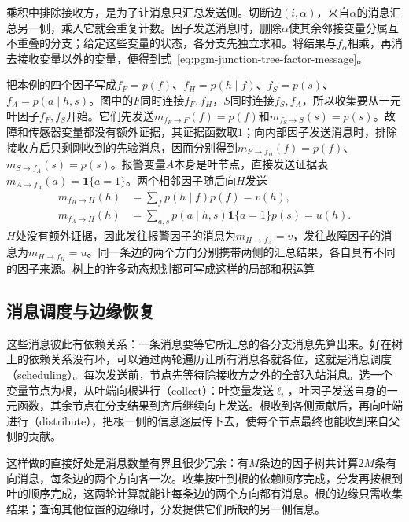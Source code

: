 乘积中排除接收方，是为了让消息只汇总发送侧。切断边$(i,\alpha)$，来自$\alpha$的消息汇总另一侧，乘入它就会重复计数。因子发送消息时，删除$\alpha$使其余邻接变量分属互不重叠的分支；给定这些变量的状态，各分支先独立求和。将结果与$f_\alpha$相乘，再消去接收变量以外的变量，便得到式~\eqref{eq:pgm-junction-tree-factor-message}。

把本例的四个因子写成$f_F=p(f)$、$f_H=p(h\mid f)$、$f_S=p(s)$、$f_A=p(a\mid h,s)$。图中的$F$同时连接$f_F,f_H$，$S$同时连接$f_S,f_A$，所以收集要从一元叶因子$f_F,f_S$开始。它们先发送$m_{f_F\to F}(f)=p(f)$和$m_{f_S\to S}(s)=p(s)$。故障和传感器变量都没有额外证据，其证据函数取$1$；向内部因子发送消息时，排除接收方后只剩刚收到的先验消息，因而分别得到$m_{F\to f_H}(f)=p(f)$、$m_{S\to f_A}(s)=p(s)$。报警变量$A$本身是叶节点，直接发送证据表$m_{A\to f_A}(a)=\mathbf{1}\{a=1\}$。两个相邻因子随后向$H$发送
\[
  \begin{aligned}
    m_{f_H\to H}(h)&=\sum_f p(h\mid f)p(f)=v(h),\\
    m_{f_A\to H}(h)&=\sum_{a,s}p(a\mid h,s)
       \mathbf{1}\{a=1\}p(s)=u(h).
  \end{aligned}
\]
$H$处没有额外证据，因此发往报警因子的消息为$m_{H\to f_A}=v$，发往故障因子的消息为$m_{H\to f_H}=u$。同一条边的两个方向分别携带两侧的汇总结果，各自具有不同的因子来源。树上的许多动态规划都可写成这样的局部和积运算

\subsection{消息调度与边缘恢复}
\label{sec:pgm-junction-tree-scheduling}

这些消息彼此有依赖关系：一条消息要等它所汇总的各分支消息先算出来。好在树上的依赖关系没有环，可以通过两轮遍历让所有消息各就各位，这就是消息调度（scheduling）。每次发送前，节点先等待除接收方之外的全部入站消息。选一个变量节点为根，从叶端向根进行（collect）：叶变量发送$\ell_i$，叶因子发送自身的一元函数，其余节点在分支结果到齐后继续向上发送。根收到各侧贡献后，再向叶端进行（distribute），把根一侧的信息逐层传下去，使每个节点最终也能收到来自父侧的贡献。

这样做的直接好处是消息数量有界且很少冗余：有$M$条边的因子树共计算$2M$条有向消息，每条边的两个方向各一次。收集按叶到根的依赖顺序完成，分发再按根到叶的顺序完成，这两轮计算就能让每条边的两个方向都有消息。根的边缘只需收集结果；查询其他位置的边缘时，分发提供它们所缺的另一侧信息。

